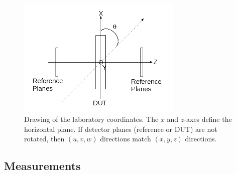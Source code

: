     \begin{figure}[!tbh]
      \centering
      \includegraphics[width = 0.7\textwidth]{Pictures/deformation/lab_frame.png}
      \caption{Drawing of the laboratory coordinates. The $x$ and $z$-axes define the horizontal plane. If detector planes (reference or DUT) are not rotated, then $(u,v,w)$ directions match $(x,y,z)$ directions.}
      \label{fig:labCoordinates}
    \end{figure}

    \subsection{Measurements}
    
